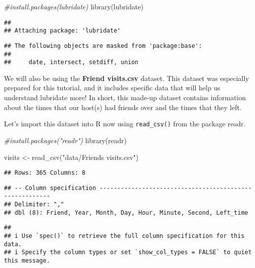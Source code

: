 \documentclass[
]{book}
\newenvironment{Shaded}{\begin{snugshade}}{\end{snugshade}}
\newcommand{\CommentTok}[1]{\textcolor[rgb]{0.56,0.35,0.01}{\textit{#1}}}
\newcommand{\FunctionTok}[1]{\textcolor[rgb]{0.00,0.00,0.00}{#1}}
\newcommand{\NormalTok}[1]{#1}
\newcommand{\OtherTok}[1]{\textcolor[rgb]{0.56,0.35,0.01}{#1}}
\newcommand{\StringTok}[1]{\textcolor[rgb]{0.31,0.60,0.02}{#1}}
\begin{document}
\begin{Shaded}
\begin{Highlighting}[]
\CommentTok{\#install.packages(lubridate)}
\FunctionTok{library}\NormalTok{(lubridate)}
\end{Highlighting}
\end{Shaded}

\begin{verbatim}
##
## Attaching package: 'lubridate'
\end{verbatim}

\begin{verbatim}
## The following objects are masked from 'package:base':
##
##     date, intersect, setdiff, union
\end{verbatim}

We will also be using the \textbf{Friend visits.csv} dataset. This dataset was especially prepared for this tutorial, and it includes specific data that will help us understand lubridate more! In short, this made-up dataset contains information about the times that our host(s) had friends over and the times that they left.

Let's import this dataset into R now using \texttt{read\_csv()} from the package readr.

\begin{Shaded}
\begin{Highlighting}[]
\CommentTok{\#install.packages("readr")}
\FunctionTok{library}\NormalTok{(readr)}
\end{Highlighting}
\end{Shaded}

\begin{Shaded}
\begin{Highlighting}[]
\NormalTok{visits }\OtherTok{\textless{}{-}} \FunctionTok{read\_csv}\NormalTok{(}\StringTok{"data/Friends visits.csv"}\NormalTok{)}
\end{Highlighting}
\end{Shaded}

\begin{verbatim}
## Rows: 365 Columns: 8
\end{verbatim}

\begin{verbatim}
## -- Column specification --------------------------------------------------------
## Delimiter: ","
## dbl (8): Friend, Year, Month, Day, Hour, Minute, Second, Left_time
\end{verbatim}

\begin{verbatim}
##
## i Use `spec()` to retrieve the full column specification for this data.
## i Specify the column types or set `show_col_types = FALSE` to quiet this message.
\end{verbatim}
\end{document}
